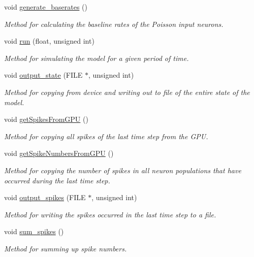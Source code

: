 \begin{DoxyCompactItemize}
void \hyperlink{classclassol_a4e4e5bee0655e84dfee6e98e6a75dc3b}{generate\+\_\+baserates} ()
\begin{DoxyCompactList}\small\item\em Method for calculating the baseline rates of the Poisson input neurons. \end{DoxyCompactList}\item 
void \hyperlink{classclassol_ae907498a8660fe41f7d9b41aad6e5d10}{run} (float, unsigned int)
\begin{DoxyCompactList}\small\item\em Method for simulating the model for a given period of time. \end{DoxyCompactList}\item 
void \hyperlink{classclassol_a88179d17f4ea568b7b58a329a741eb53}{output\+\_\+state} (F\+I\+L\+E $\ast$, unsigned int)
\begin{DoxyCompactList}\small\item\em Method for copying from device and writing out to file of the entire state of the model. \end{DoxyCompactList}\item 
void \hyperlink{classclassol_ae571e028c069103e19bb4975bdb0dd47}{get\+Spikes\+From\+G\+P\+U} ()
\begin{DoxyCompactList}\small\item\em Method for copying all spikes of the last time step from the G\+P\+U. \end{DoxyCompactList}\item 
void \hyperlink{classclassol_a08d82fc16288158062aef866a1e29a65}{get\+Spike\+Numbers\+From\+G\+P\+U} ()
\begin{DoxyCompactList}\small\item\em Method for copying the number of spikes in all neuron populations that have occurred during the last time step. \end{DoxyCompactList}\item 
void \hyperlink{classclassol_a54d61e7df53d16d7b8e1de46bcca6c6c}{output\+\_\+spikes} (F\+I\+L\+E $\ast$, unsigned int)
\begin{DoxyCompactList}\small\item\em Method for writing the spikes occurred in the last time step to a file. \end{DoxyCompactList}\item 
void \hyperlink{classclassol_af9dfaa92f0e4737dbadd9ec9cd203555}{sum\+\_\+spikes} ()
\begin{DoxyCompactList}\small\item\em Method for summing up spike numbers. \end{DoxyCompactList}\item 

\end{DoxyCompactItemize}
